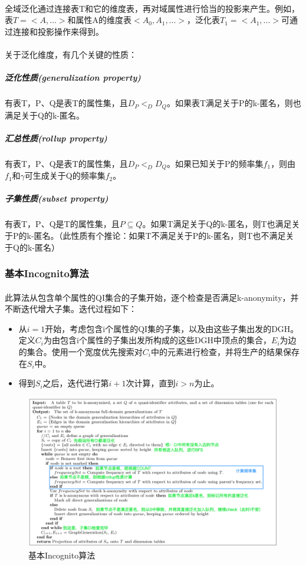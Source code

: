 \documentclass[12pt,a4paper]{article}
\begin{document}
\paragraph{} 全域泛化通过连接表T和它的维度表，再对域属性进行恰当的投影来产生。例如，表$T=<A,...>$和属性A的维度表$<A_0,A_1,...>$，泛化表$T_1=<A_1,...>$可通过连接和投影操作来得到。
\paragraph{}关于泛化维度，有几个关键的性质：
	\subparagraph{泛化性质(generalization property)} 有表T，P、Q是表T的属性集，且$D_P <_D D_Q$。如果表T满足关于P的k-匿名，则也满足关于Q的k-匿名。
	\subparagraph{汇总性质(rollup property)} 有表T，P、Q是表T的属性集，且$D_P <_D D_Q$。如果已知关于P的频率集$f_1$，则由$f_1$和$\gamma$可生成关于Q的频率集$f_2$。
	\subparagraph{子集性质(subset property)} 有表T，P、Q是T的属性集，且$P \subseteq Q$。如果T满足关于Q的k-匿名，则T也满足关于P的k-匿名。（此性质有个推论：如果T不满足关于P的k-匿名，则T也不满足关于Q的k-匿名）
	
\subsubsection{基本Incognito算法}
\paragraph{} 此算法从包含单个属性的QI集合的子集开始，逐个检查是否满足k-anonymity，并不断迭代增大子集。迭代过程如下：
\begin{itemize}
	\item 从$i=1$开始，考虑包含i个属性的QI集的子集，以及由这些子集出发的DGH。定义$C_i$为由包含i个属性的子集出发所构成的这些DGH中顶点的集合，$E_i$为边的集合。使用一个宽度优先搜索对$C_i$中的元素进行检查，并将生产的结果保存在$S_i$中。
	\item 得到$S_i$之后，迭代进行第$i+1$次计算，直到$i>n$为止。
\end{itemize}
\begin{figure}[H]
	\centering
	\includegraphics[width=1\textwidth]{../images/incognito.png}
	\caption{基本Incognito算法}
	\label{incognito}
\end{figure}
\end{document}
